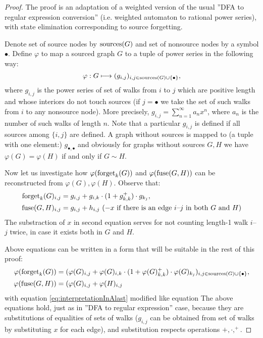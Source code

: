 \begin{proof}
        The proof is an adaptation of a weighted version of the usual ''DFA to regular expression conversion'' (i.e. weighted automaton to rational power series), with state elimination corresponding to source forgetting.
    
    Denote set of source nodes by $\operatorname{sources}(G)$ and set of nonsource nodes by a symbol $\bullet$. Define $\varphi$ to map a sourced graph $G$ to a tuple of power series in the following way:
    $$
    \varphi: G \longmapsto (g_{i,j})_{i,j \in \operatorname{sources}(G) \cup \{\bullet\}},
    $$
    where $g_{i,j}$ is the power series of set of walks from $i$ to $j$ which are positive length and whose interiors do not touch sources (if $j=\bullet$ we take the set of such walks from $i$ to any nonsource node). More precisely, $g_{i,j} = \sum_{n=1}^{\infty} a_n x^n$, where $a_n$ is the number of such walks of length $n$. Note that a particular $g_{i,j}$ is defined if all sources among $\{i,j\}$ are defined. A graph without sources is mapped to (a tuple with one element:) $g_{\bullet, \bullet}$ and obviously for graphs without sources $G, H$ we have $\varphi(G) = \varphi(H)$ if and only if $G \sim H$.
    
    Now let us investigate how $\varphi(\operatorname{forget}_k(G))$ and $\varphi(\operatorname{fuse}(G, H))$ can be reconstructed from $\varphi(G), \varphi(H)$.
    Observe that:
    \begin{align}\label{eq:equationForForget}
    	\operatorname{forget}_k(G)_{i,j} &= g_{i,j} + g_{i,k}\cdot(1 + g_{k,k}^+)\cdot g_{k_j},\\
    	\operatorname{fuse}(G, H)_{i,j} &= g_{i,j} + h_{i,j} \ (- x \text{ if there is an edge } i\text{--}j \text{ in both } G \text{ and } H)
    	\label{eq:equationForJoin}
    \end{align}
    The substraction of $x$ in second equation serves for not counting length-1 walk $i$--$j$ twice, in case it exists both in $G$ and $H$.
    
    Above equations can be written in a form that will be suitable in the rest of this proof:
    \begin{align}
    	\label{eq:interpretationInAfirst}
   		\varphi(\operatorname{forget}_k(G)) &= (\varphi(G)_{i,j} + \varphi(G)_{i,k}\cdot(1 + \varphi(G)_{k,k}^+)\cdot \varphi(G)_{k_j})_{i,j \in \operatorname{sources}(G) \cup \{\bullet\}},\\
    	\varphi(\operatorname{fuse}(G, H)) &= (\varphi(G)_{i,j} + \varphi(H)_{i,j}
    	\label{eq:interpretationInAlast}
    \end{align}
    with equation \eqref{eq:interpretationInAlast} modified like equation 
    The above equations hold, just as in ''DFA to regular expression'' case, because they are substitutions of equalities of sets of walks ($g_{i,j}$ can be obtained from set of walks by substituting $x$ for each edge), and substitution respects operations $+, \cdot, ^+$.
    

\end{proof}
